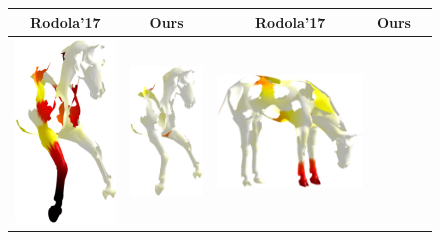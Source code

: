 \begin{figure}[h!]
	\centering
	\setlength\tabcolsep{0.5pt}
	\begin{tabular}[width=0.8\textwidth]{cc|ccc}
		Rodola'17\cite{rodola2017partial} & Ours
		&  Rodola'17\cite{rodola2017partial} & Ours& \\ \hline
		\includegraphics[scale=0.5]{figures/holes_horse_12_err_PFM.png} & \includegraphics[scale=0.5]{figures/holes_horse_12_err.png} &  \includegraphics[scale=0.5]{figures/holes_horse_16_err_PFM.png}&

\end{tabular}
\end{figure}
